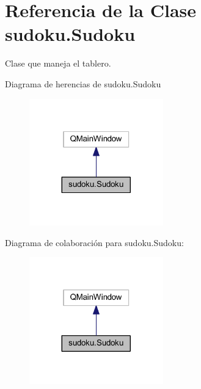 \section{Referencia de la Clase sudoku.\-Sudoku}
\label{classsudoku_1_1_sudoku}


Clase que maneja el tablero.  




Diagrama de herencias de sudoku.\-Sudoku\nopagebreak
\begin{figure}[H]
\begin{center}
\leavevmode
\includegraphics[width=164pt]{classsudoku_1_1_sudoku__inherit__graph}
\end{center}
\end{figure}


Diagrama de colaboración para sudoku.\-Sudoku\-:\nopagebreak
\begin{figure}[H]
\begin{center}
\leavevmode
\includegraphics[width=164pt]{classsudoku_1_1_sudoku__coll__graph}
\end{center}
\end{figure}
